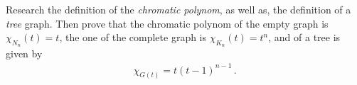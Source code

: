 \exercise[%
  topic=Chromatic Polynom,
    ]

Research the definition of the \emph{chromatic polynom}, as well as, the definition of a \emph{tree} graph. Then prove that the chromatic polynom of the empty graph is $\chi_{N_n}(t) =t$, the one of the complete graph is $\chi_{K_n}(t) =t^n$, and of a tree is given by
\begin{align}
\chi_{G(t)} = t(t-1)^{n-1}\,.
\end{align}

 


	

